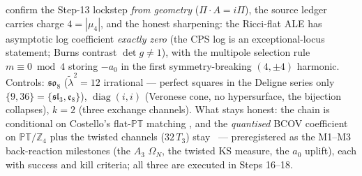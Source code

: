 \documentclass[11pt,a4paper]{article}
\newcommand{\Z}{\mathbb{Z}}
\theoremstyle{definition}
\begin{document}
confirm the Step-13 lockstep \emph{from geometry} ($\Pi\cdot A=i\Pi$), the source ledger carries
charge $4=|\mu_4|$, and the honest sharpening: the Ricci-flat ALE has asymptotic log coefficient
\emph{exactly zero} (the CPS log is an exceptional-locus statement; Burns contrast
$\det g\neq1$), with the multipole selection rule $m\equiv0\bmod4$ storing $-a_0$ in the first
symmetry-breaking $(4,\pm4)$ harmonic. Controls: $\mathfrak{so}_8$ ($\tilde\lambda^2=12$
irrational --- perfect squares in the Deligne series only $\{9,36\}=\{\mathfrak{sl}_3,
\mathfrak e_8\}$), $\operatorname{diag}(i,i)$ (Veronese cone, no hypersurface, the bijection
collapses), $k=2$ (three exchange channels). What stays honest: the chain is conditional on
Costello's flat-$\mathbb{PT}$ matching \mC, and the \emph{quantised} BCOV coefficient on
$\mathbb{PT}/\Z_4$ plus the twisted channels ($32\,T_3$) stay \mO\ --- preregistered as the
M1--M3 back-reaction milestones (the $A_3$ $\Omega_N$, the twisted KS measure, the $a_0$
uplift), each with success and kill criteria; all three are executed in Steps 16--18.
\end{document}
